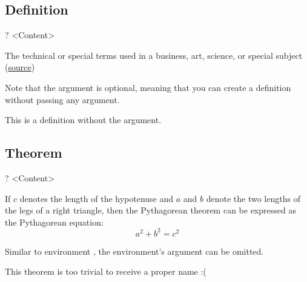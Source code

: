 \documentclass{article}
\begin{document}
    \subsection{Definition}

\begin{codeblock}[tex]
\begin{definition}[<Term>]?
    <Content>
\end{definition}
\end{codeblock}

    \begin{definition}[Terminology]
        The technical or special terms used in a business, art, science, or special subject (\href{https://www.merriam-webster.com/dictionary/terminology}{source})
    \end{definition}

    Note that the argument  is optional, meaning that you can create a definition without passing any argument.

    \begin{definition}
        This is a definition without the  argument.
    \end{definition}

    \subsection{Theorem}

\begin{codeblock}[tex]
\begin{theorem}?
    <Content>
\end{theorem}
\end{codeblock}

\begin{theorem}
    If $c$ denotes the length of the hypotenuse and $a$ and $b$ denote the two lengths of the legs of a right triangle, then the Pythagorean theorem can be expressed as the Pythagorean equation: 
    \begin{equation*}
        a^2 + b^2 = c^2
    \end{equation*}
\end{theorem}

Similar to environment , the  environment's argument can be omitted.

\begin{theorem}[]
    This theorem is too trivial to receive a proper name :(
\end{theorem}
\end{document}
